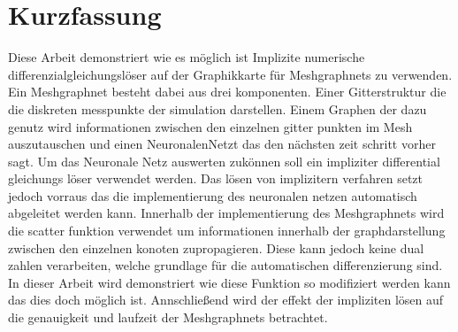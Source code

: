 \chapter*{Kurzfassung}

Diese Arbeit demonstriert wie es möglich ist Implizite numerische differenzialgleichungslöser 
auf der Graphikkarte für Meshgraphnets zu verwenden.
Ein Meshgraphnet besteht dabei aus drei komponenten.
Einer Gitterstruktur die die diskreten messpunkte der simulation darstellen.
Einem Graphen der dazu genutz wird informationen zwischen den einzelnen gitter punkten im Mesh auszutauschen
und einen NeuronalenNetzt das den nächsten zeit schritt vorher sagt.
Um das Neuronale Netz auswerten zukönnen soll ein impliziter differential gleichungs löser verwendet werden.
Das lösen von implizitern verfahren setzt jedoch vorraus das die implementierung des neuronalen
netzen automatisch abgeleitet werden kann.
Innerhalb der implementierung des Meshgraphnets wird die scatter funktion verwendet um informationen
innerhalb der graphdarstellung zwischen den einzelnen konoten zupropagieren.
Diese kann jedoch keine dual zahlen verarbeiten, welche grundlage für die automatischen differenzierung sind.
In dieser Arbeit wird demonstriert wie diese Funktion so modifiziert werden kann das dies doch möglich ist.
Annschließend wird der effekt der impliziten lösen auf die genauigkeit und laufzeit der Meshgraphnets betrachtet. 

\cleardoublepage